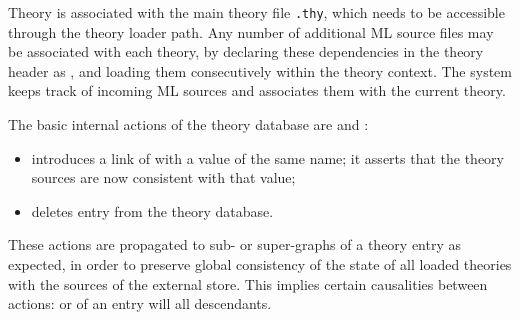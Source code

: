 \begin{isabellebody}
\begin{isamarkuptext}
  Theory  is associated with the main theory file \verb,.thy,, which needs to be accessible through the theory
  loader path.  Any number of additional ML source files may be
  associated with each theory, by declaring these dependencies in the
  theory header as , and loading them consecutively
  within the theory context.  The system keeps track of incoming ML
  sources and associates them with the current theory.

  The basic internal actions of the theory database are  and :

  \begin{itemize}

  \item {} introduces a link of  with a
   value of the same name; it asserts that the theory
  sources are now consistent with that value;

  \item {} deletes entry  from the theory
  database.
  
  \end{itemize}

  These actions are propagated to sub- or super-graphs of a theory
  entry as expected, in order to preserve global consistency of the
  state of all loaded theories with the sources of the external store.
  This implies certain causalities between actions: 
  or  of an entry will  all
  descendants.


\end{isamarkuptext}
\end{isabellebody}
